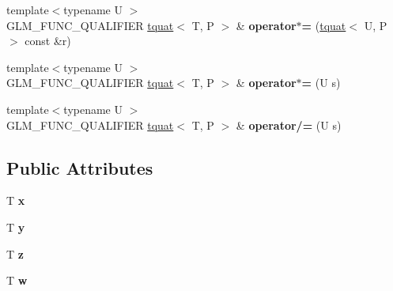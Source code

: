 \begin{DoxyCompactItemize}
\item 
\hypertarget{structglm_1_1tquat_a98b7195afd81e7fbf097208c75602240}{{\footnotesize template$<$typename U $>$ }\\G\-L\-M\-\_\-\-F\-U\-N\-C\-\_\-\-Q\-U\-A\-L\-I\-F\-I\-E\-R \hyperlink{structglm_1_1tquat}{tquat}$<$ T, P $>$ \& {\bfseries operator$\ast$=} (\hyperlink{structglm_1_1tquat}{tquat}$<$ U, P $>$ const \&r)}\label{structglm_1_1tquat_a98b7195afd81e7fbf097208c75602240}

\item 
\hypertarget{structglm_1_1tquat_aa6217e9a0b83ec0cabdd32dce73d8d05}{{\footnotesize template$<$typename U $>$ }\\G\-L\-M\-\_\-\-F\-U\-N\-C\-\_\-\-Q\-U\-A\-L\-I\-F\-I\-E\-R \hyperlink{structglm_1_1tquat}{tquat}$<$ T, P $>$ \& {\bfseries operator$\ast$=} (U s)}\label{structglm_1_1tquat_aa6217e9a0b83ec0cabdd32dce73d8d05}

\item 
\hypertarget{structglm_1_1tquat_a320e96991b6611e14172310e42f72d5f}{{\footnotesize template$<$typename U $>$ }\\G\-L\-M\-\_\-\-F\-U\-N\-C\-\_\-\-Q\-U\-A\-L\-I\-F\-I\-E\-R \hyperlink{structglm_1_1tquat}{tquat}$<$ T, P $>$ \& {\bfseries operator/=} (U s)}\label{structglm_1_1tquat_a320e96991b6611e14172310e42f72d5f}

\end{DoxyCompactItemize}
\subsection*{Public Attributes}
\begin{DoxyCompactItemize}
\item 
\hypertarget{structglm_1_1tquat_a4e7a21e85428fa8d10e613f109185f28}{T {\bfseries x}}\label{structglm_1_1tquat_a4e7a21e85428fa8d10e613f109185f28}

\item 
\hypertarget{structglm_1_1tquat_a06d5c5fb3b08ec993fb4dd74b22fc011}{T {\bfseries y}}\label{structglm_1_1tquat_a06d5c5fb3b08ec993fb4dd74b22fc011}

\item 
\hypertarget{structglm_1_1tquat_a1b28678ac0e0b3ac2537059754df9fdf}{T {\bfseries z}}\label{structglm_1_1tquat_a1b28678ac0e0b3ac2537059754df9fdf}

\item 
\hypertarget{structglm_1_1tquat_a91055a4c17113bd3f357ffd8595d8ac0}{T {\bfseries w}}\label{structglm_1_1tquat_a91055a4c17113bd3f357ffd8595d8ac0}

\end{DoxyCompactItemize}


